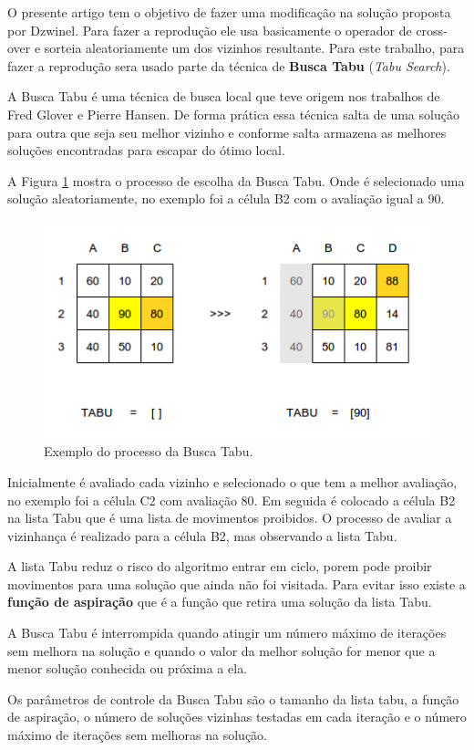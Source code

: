 \documentclass[12pt]{article}
\begin{document}
O presente artigo tem o objetivo de fazer uma modificação na solução proposta
por Dzwinel. Para fazer a reprodução ele usa basicamente o operador de cross-
over e sorteia aleatoriamente um dos vizinhos resultante. Para este trabalho, 
para fazer a reprodução sera usado parte da técnica de \textbf{Busca Tabu}
(\textit{Tabu Search}).

A Busca Tabu é uma técnica de busca local que teve origem nos trabalhos de
Fred Glover e Pierre Hansen. De forma prática essa técnica salta de uma
solução para outra que seja seu melhor vizinho e conforme salta armazena as
melhores soluções encontradas para escapar do ótimo local.

A Figura \ref{fig:busca-tabu} mostra o processo de escolha da Busca Tabu.
Onde é selecionado uma solução aleatoriamente, no exemplo foi a célula B2 com
o avaliação igual a 90.

\begin{figure}[h!]
\centering
\includegraphics[width=.5\textwidth]{imagens/busca-tabu}
\caption{Exemplo do processo da Busca Tabu.}
\label{fig:busca-tabu}
\end{figure}

Inicialmente é avaliado cada vizinho e selecionado o que tem a melhor
avaliação, no exemplo foi a célula C2 com avaliação 80. Em seguida é colocado
a célula B2 na lista Tabu que é uma lista de movimentos proibidos. O processo
de avaliar a vizinhança é realizado para a célula B2, mas observando a lista
Tabu.

A lista Tabu reduz o risco do algoritmo entrar em ciclo, porem pode proibir
movimentos para uma solução que ainda não foi visitada. Para evitar isso
existe a \textbf{função de aspiração} que é a função que retira uma solução da
lista Tabu.

A Busca Tabu é interrompida quando atingir um número máximo de iterações sem
melhora na solução e quando o valor da melhor solução for menor que a menor
solução conhecida ou próxima a ela.

Os parâmetros de controle da Busca Tabu são o tamanho da lista tabu, a função
de aspiração, o número de soluções vizinhas testadas em cada iteração e o
número máximo de iterações sem melhoras na solução.
\end{document}

